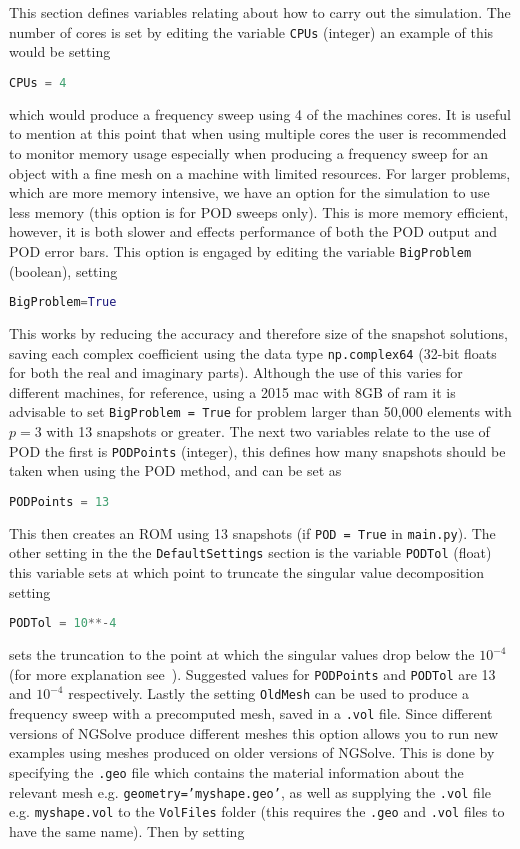 \noindent
This section defines variables relating about how to carry out the simulation. The number of cores is set by editing the variable \texttt{CPUs} (integer) an example of this would be setting
\begin{lstlisting}[language=Python]
CPUs = 4
\end{lstlisting}
which would produce a frequency sweep using 4 of the machines cores. It is useful to mention at this point that when using multiple cores the user is recommended to monitor memory usage especially when producing a frequency sweep for an object with a fine mesh on a machine with limited resources. For larger problems, which are more memory intensive, we have an option for the simulation to use less memory (this option is for POD sweeps only). This is more memory efficient, however, it is both slower and effects performance of both the POD output and POD error bars. This option is engaged by editing the variable \texttt{BigProblem} (boolean), setting
\begin{lstlisting}[language=Python]
BigProblem=True
\end{lstlisting}
This works by reducing the accuracy and therefore size of the snapshot solutions, saving each complex coefficient using the data type \texttt{np.complex64} (32-bit floats for both the real and imaginary parts). Although the use of this varies for different machines, for reference, using a 2015 mac with 8GB of ram it is advisable to set \texttt{BigProblem = True} for problem larger than 50,000 elements with $p=3$ with 13 snapshots or greater. The next two variables relate to the use of POD the first is \texttt{PODPoints} (integer), this defines how many snapshots should be taken when using the POD method, and can be set as
\begin{lstlisting}[language=Python]
PODPoints = 13
\end{lstlisting}
This then creates an ROM using 13 snapshots (if \texttt{POD = True} in \texttt{main.py}). The other setting in the the \texttt{DefaultSettings} section is the variable \texttt{PODTol} (float) this variable sets at which point to truncate the singular value decomposition setting
\begin{lstlisting}[language=Python]
PODTol = 10**-4
\end{lstlisting}
sets the truncation to the point at which the singular values drop below the $10^{-4}$ (for more explanation see~\cite{wilsonledger2019}). Suggested values for \texttt{PODPoints} and \texttt{PODTol} are 13 and $10^{-4}$ respectively. Lastly the setting \texttt{OldMesh} can be used to produce a frequency sweep with a precomputed mesh, saved in a \texttt{.vol} file. Since different versions of NGSolve produce different meshes this option allows you to run new examples using meshes produced on older versions of NGSolve. This is done by specifying the \texttt{.geo} file which contains the material information about the relevant mesh e.g. \texttt{geometry='myshape.geo'}, as well as supplying the \texttt{.vol} file e.g. \texttt{myshape.vol} to the \texttt{VolFiles} folder (this requires the \texttt{.geo} and \texttt{.vol} files to have the same name). Then by setting
